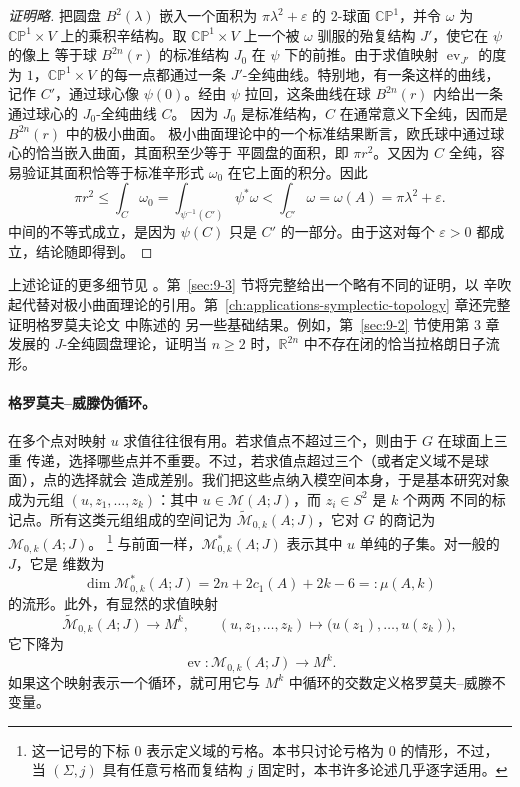 \begin{proof}[证明略]
把圆盘 $B^2(\lambda)$ 嵌入一个面积为 $\pi\lambda^2+\varepsilon$ 的 $2$-球面
$\mathbb{CP}^1$，并令 $\omega$ 为 $\mathbb{CP}^1\times V$ 上的乘积辛结构。取
$\mathbb{CP}^1\times V$ 上一个被 $\omega$ 驯服的殆复结构 $J'$，使它在 $\psi$ 的像上
等于球 $B^{2n}(r)$ 的标准结构 $J_0$ 在 $\psi$ 下的前推。由于求值映射
$\operatorname{ev}_{J'}$ 的度为 $1$，$\mathbb{CP}^1\times V$ 的每一点都通过一条
$J'$-全纯曲线。特别地，有一条这样的曲线，记作 $C'$，通过球心像 $\psi(0)$。经由
$\psi$ 拉回，这条曲线在球 $B^{2n}(r)$ 内给出一条通过球心的 $J_0$-全纯曲线 $C$。
因为 $J_0$ 是标准结构，$C$ 在通常意义下全纯，因而是 $B^{2n}(r)$ 中的极小曲面。
极小曲面理论中的一个标准结果断言，欧氏球中通过球心的恰当嵌入曲面，其面积至少等于
平圆盘的面积，即 $\pi r^2$。又因为 $C$ 全纯，容易验证其面积恰等于标准辛形式
$\omega_0$ 在它上面的积分。因此
\[
  \pi r^2
  \le \int_C\omega_0
  =\int_{\psi^{-1}(C')}\psi^*\omega
  <\int_{C'}\omega
  =\omega(A)=\pi\lambda^2+\varepsilon.
\]
中间的不等式成立，是因为 $\psi(C)$ 只是 $C'$ 的一部分。由于这对每个
$\varepsilon>0$ 都成立，结论随即得到。
\end{proof}

上述论证的更多细节见 。第~\ref{sec:9-3} 节将完整给出一个略有不同的证明，以
辛吹起代替对极小曲面理论的引用。第~\ref{ch:applications-symplectic-topology} 章还完整证明格罗莫夫论文  中陈述的
另一些基础结果。例如，第~\ref{sec:9-2} 节使用第 3 章发展的 $J$-全纯圆盘理论，证明当 $n\ge2$
时，$\mathbb R^{2n}$ 中不存在闭的恰当拉格朗日子流形。

\paragraph{格罗莫夫--威滕伪循环。}
在多个点对映射 $u$ 求值往往很有用。若求值点不超过三个，则由于 $G$ 在球面上三重
传递，选择哪些点并不重要。不过，若求值点超过三个（或者定义域不是球面），点的选择就会
造成差别。我们把这些点纳入模空间本身，于是基本研究对象成为元组
$(u,z_1,\dots,z_k)$：其中 $u\in\mathcal M(A;J)$，而 $z_i\in S^2$ 是 $k$ 个两两
不同的标记点。所有这类元组组成的空间记为 $\widetilde{\mathcal M}_{0,k}(A;J)$，它对
$G$ 的商记为 $\mathcal M_{0,k}(A;J)$。
\footnote{这一记号的下标 $0$ 表示定义域的亏格。本书只讨论亏格为 $0$ 的情形，不过，
当 $(\Sigma,j)$ 具有任意亏格而复结构 $j$ 固定时，本书许多论述几乎逐字适用。}
与前面一样，$\mathcal M^*_{0,k}(A;J)$ 表示其中 $u$ 单纯的子集。对一般的 $J$，它是
维数为
\[
  \dim\mathcal M^*_{0,k}(A;J)
  =2n+2c_1(A)+2k-6=:\mu(A,k)
\]
的流形。此外，有显然的求值映射
\[
  \widetilde{\mathcal M}_{0,k}(A;J)\longrightarrow M^k,
  \qquad (u,z_1,\dots,z_k)\longmapsto\bigl(u(z_1),\dots,u(z_k)\bigr),
\]
它下降为
\[
  \operatorname{ev}:\mathcal M_{0,k}(A;J)\longrightarrow M^k.
\]
如果这个映射表示一个循环，就可用它与 $M^k$ 中循环的交数定义格罗莫夫--威滕不变量。

